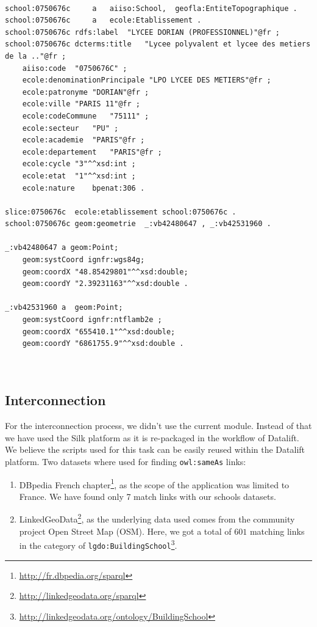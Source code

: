\begin{lstlisting}

school:0750676c 	a	aiiso:School,  geofla:EntiteTopographique .
school:0750676c 	a	ecole:Etablissement .
school:0750676c	rdfs:label	"LYCEE DORIAN (PROFESSIONNEL)"@fr ;
school:0750676c	dcterms:title	"Lycee polyvalent et lycee des metiers de la .."@fr ;
	aiiso:code	"0750676C" ;
	ecole:denominationPrincipale "LPO LYCEE DES METIERS"@fr ;
	ecole:patronyme	"DORIAN"@fr ;
	ecole:ville	"PARIS 11"@fr ;
	ecole:codeCommune	"75111" ;
	ecole:secteur	"PU" ;
	ecole:academie	"PARIS"@fr ;
	ecole:departement	"PARIS"@fr ;
	ecole:cycle	"3"^^xsd:int ;
	ecole:etat	"1"^^xsd:int ;
	ecole:nature	bpenat:306 .

slice:0750676c	ecole:etablissement	school:0750676c .
school:0750676c	geom:geometrie	_:vb42480647 , _:vb42531960 .		 

_:vb42480647 a geom:Point;
	geom:systCoord ignfr:wgs84g;
	geom:coordX "48.85429801"^^xsd:double;
	geom:coordY "2.39231163"^^xsd:double . 

_:vb42531960 a  geom:Point;
	geom:systCoord ignfr:ntflamb2e ;
	geom:coordX "655410.1"^^xsd:double;
	geom:coordY "6861755.9"^^xsd:double .
     
	
\end{lstlisting}

\subsection{Interconnection}
For the interconnection process, we didn't use the current module. Instead of that we have used the Silk \cite{jentzsch2010silk} platform as it is re-packaged in the workflow of Datalift. We believe the scripts used for this task can be easily reused within the Datalift platform. Two datasets where used for finding \texttt{owl:sameAs} links:
\begin{enumerate}
\item DBpedia French chapter\footnote{\url{http://fr.dbpedia.org/sparql}}, as the scope of the application was limited to France. We have found only 7 match links with our schools datasets.
\item LinkedGeoData\footnote{\url{http://linkedgeodata.org/sparql}}, as the underlying data used comes from the community project Open Street Map (OSM). Here, we got  a total of $601$ matching links in the category of \texttt{lgdo:BuildingSchool}\footnote{\url{http://linkedgeodata.org/ontology/BuildingSchool}}. 
\end{enumerate}

